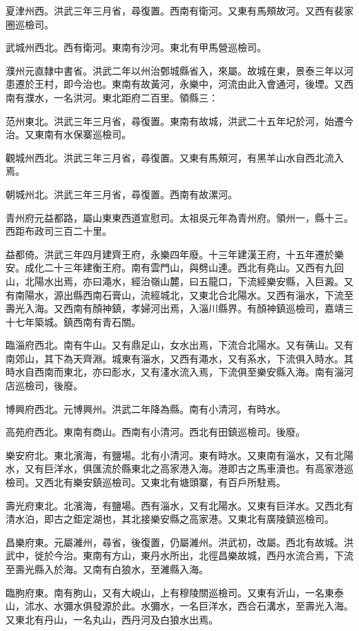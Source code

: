 夏津州西。洪武三年三月省，尋復置。西南有衛河。又東有馬頰故河。又西有裴家圈巡檢司。

武城州西北。西有衛河。東南有沙河。東北有甲馬營巡檢司。

濮州元直隸中書省。洪武二年以州治鄄城縣省入，來屬。故城在東，景泰三年以河患遷於王村，即今治也。東南有故黃河，永樂中，河流由此入會通河，後堙。又西南有濮水，一名洪河。東北距府二百里。領縣三：

范州東北。洪武三年三月省，尋復置。東南有故城，洪武二十五年圮於河，始遷今治。又東南有水保寨巡檢司。

觀城州西北。洪武三年三月省，尋復置。又東有馬頰河，有黑羊山水自西北流入焉。

朝城州北。洪武三年三月省，尋復置。西南有故漯河。

青州府元益都路，屬山東東西道宣慰司。太祖吳元年為青州府。領州一，縣十三。西距布政司三百二十里。

益都倚。洪武三年四月建齊王府，永樂四年廢。十三年建漢王府，十五年遷於樂安。成化二十三年建衡王府。南有雲門山，與劈山連。西北有堯山。又西有九回山，北陽水出焉，亦曰澠水，經治嶺山麓，曰五龍口，下流經樂安縣，入巨澱。又有南陽水，源出縣西南石膏山，流經城北，又東北合北陽水。又西有淄水，下流至壽光入海。又西南有顏神鎮，孝婦河出焉，入淄川縣界。有顏神鎮巡檢司，嘉靖三十七年築城。鎮西南有青石關。

臨淄府西北。南有牛山。又有鼎足山，女水出焉，下流合北陽水。又有蒨山。又有南郊山，其下為天齊淵。城東有淄水，又西有澠水，又有系水，下流俱入時水。其時水自西南而東北，亦曰耏水，又有澅水流入焉，下流俱至樂安縣入海。南有淄河店巡檢司，後廢。

博興府西北。元博興州。洪武二年降為縣。南有小清河，有時水。

高苑府西北。東南有商山。西南有小清河。西北有田鎮巡檢司。後廢。

樂安府北。東北濱海，有鹽場。北有小清河。東有時水。又東南有淄水，又有北陽水，又有巨洋水，俱匯流於縣東北之高家港入海。港即古之馬車瀆也。有高家港巡檢司。又西北有樂安鎮巡檢司。又東北有塘頭寨，有百戶所駐焉。

壽光府東北。北濱海，有鹽場。西有淄水，又有北陽水。又東有巨洋水。又西北有清水泊，即古之鉅定湖也，其北接樂安縣之高家港。又東北有廣陵鎮巡檢司。

昌樂府東。元屬濰州，尋省，後復置，仍屬濰州。洪武初，改屬。西北有故城。洪武中，徙於今治。東南有方山，東丹水所出，北徑昌樂故城，西丹水流合焉，下流至壽光縣入於海。又南有白狼水，至濰縣入海。

臨朐府東。南有朐山，又有大峴山，上有穆陵關巡檢司。又東有沂山，一名東泰山，沭水、水彌水俱發源於此。水彌水，一名巨洋水，西合石溝水，至壽光入海。又東北有丹山，一名丸山，西丹河及白狼水出焉。

